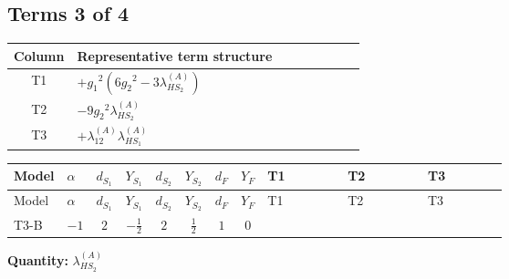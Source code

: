\documentclass[8pt]{article}
\begin{document}
\begin{landscape}
\subsection*{Terms 3 of 4}
\begin{center}
\begin{tabular}{@{}c >{\raggedright\arraybackslash}p{0.82\linewidth}@{}}
\toprule
Column & Representative term structure \\
\midrule
T1 & \(\displaystyle +{g_1}^2 \left(6 {g_2}^2-3 {\lambda_{HS_2}^{(A)}}\right)\) \\
\midrule
T2 & \(\displaystyle -9 {g_2}^2 {\lambda_{HS_2}^{(A)}}\) \\
\midrule
T3 & \(\displaystyle +{\lambda_{12}^{(A)}} {\lambda_{HS_1}^{(A)}}\) \\
\midrule
\bottomrule
\end{tabular}
\end{center}
\smallskip
\tiny
\begin{longtable}{@{}llcccccc >{\raggedright\arraybackslash}p{0.21\linewidth} >{\raggedright\arraybackslash}p{0.21\linewidth} >{\raggedright\arraybackslash}p{0.21\linewidth}@{}}
\toprule
Model & $\alpha$ & $d_{S_1}$ & $Y_{S_1}$ & $d_{S_2}$ & $Y_{S_2}$ & $d_F$ & $Y_F$ & T1 & T2 & T3 \\
\midrule
\endfirsthead
\toprule
Model & $\alpha$ & $d_{S_1}$ & $Y_{S_1}$ & $d_{S_2}$ & $Y_{S_2}$ & $d_F$ & $Y_F$ & T1 & T2 & T3 \\
\midrule
\endhead
T3-B & $-1$ & $2$ & $-\frac{1}{2}$ & $2$ & $\frac{1}{2}$ & $1$ & $0$ & \scriptsize\adjustbox{max width=\linewidth}{$\begin{gathered} +{g_1}^2 \left(6 {g_2}^2-3 {\lambda_{HS_2}^{(A)}}\right)\end{gathered}$} & \scriptsize\adjustbox{max width=\linewidth}{$\begin{gathered} -9 {g_2}^2 {\lambda_{HS_2}^{(A)}}\end{gathered}$} & \scriptsize\adjustbox{max width=\linewidth}{$\begin{gathered} +{\lambda_{12}^{(A)}} {\lambda_{HS_1}^{(A)}}\end{gathered}$} \\
\midrule
\bottomrule
\end{longtable}
\clearpage
\noindent\textbf{Quantity: }$\lambda_{HS_2}^{(A)}$\par\smallskip

\end{landscape}
\end{document}
